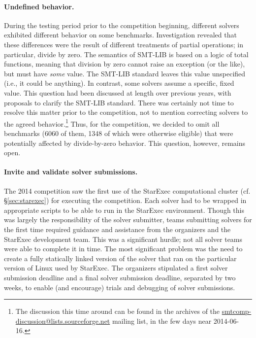 \documentclass[twoside,11pt]{article}
\begin{document}
\paragraph{Undefined behavior.} \label{par:undefined} During the testing period prior to the competition beginning, different solvers exhibited different behavior on some benchmarks. Investigation revealed that these differences were the result of different treatments of partial operations; in particular, divide by zero.  The semantics of SMT-LIB is based on a logic of total functions, meaning that division by zero cannot raise an exception (or the like), but must have \emph{some} value.  The SMT-LIB standard leaves this value unspecified (i.e., it could be anything).  In contrast, some solvers assume a specific, fixed value.  This question had been discussed at length over previous years, with proposals to clarify the SMT-LIB standard.  There was certainly not time to resolve this matter prior to the competition, not to mention correcting solvers to the agreed behavior.\footnote{The discussion this time around can be found in the archives of the \url{smtcomp-discussion@lists.sourceforge.net} mailing list, in the few days near 2014-06-16.}  Thus, for the competition, we decided to omit all benchmarks (6060 of them, 1348 of which were otherwise eligible) that were potentially affected by divide-by-zero behavior.  This question, however, remains open.

\paragraph{Invite and validate solver submissions.} The 2014 competition saw the first use of the StarExec computational cluster (cf. \S\ref{sec:starexec}) for executing the competition. Each solver had to be wrapped in appropriate scripts to be able to run in the StarExec environment. Though this was largely the responsibility of the solver submitter, teams submitting solvers for the first time required guidance and assistance from the organizers and the StarExec development team. This was a significant hurdle; not all solver teams were able to complete it in time. The most significant problem was the need to create a fully statically linked version of the solver that ran on the particular version of Linux used by StarExec. The organizers stipulated a first solver submission deadline and a final solver submission deadline, separated by two weeks, to enable (and encourage) trials and debugging of solver submissions.
\end{document}
